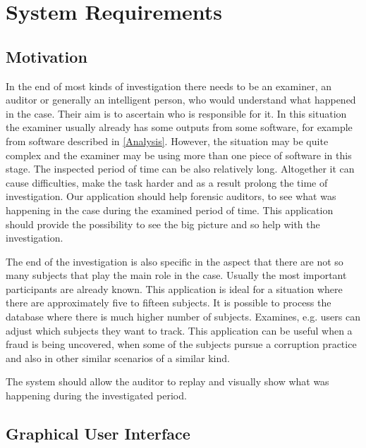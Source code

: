 \chapter{System Requirements} \label{Requirements}

\section{Motivation} In the end of most kinds of investigation there needs to be an examiner, an auditor or generally an intelligent person, who would understand what happened in the case. 
Their aim is to ascertain who is responsible for it. In this situation the examiner usually already has some outputs from some software, for example from software described in \ref{Analysis}. However, the situation may be quite complex and the examiner may be using more than one piece of software in this stage. The inspected period of time can be also relatively long. Altogether it can cause difficulties, make the task harder and as a result prolong the time of investigation. Our application should help forensic auditors, to see what was happening in the case during the examined period of time. This application should provide the possibility to see the big picture and so help with the investigation.

The end of the investigation is also specific in the aspect that there are not so many subjects that play the main role in the case. Usually the most important participants are already known. This application is ideal for a situation where there are approximately  five to fifteen subjects. It is possible to process the database where there is much higher number of subjects. Examines, e.g. users can adjust which subjects they want to track. This application can be useful when a fraud is being uncovered, when some of the subjects pursue a corruption practice and also in other similar scenarios of a similar kind. 

The system should allow the auditor to replay and visually show what was happening during the investigated period. 

\section{Graphical User Interface}

